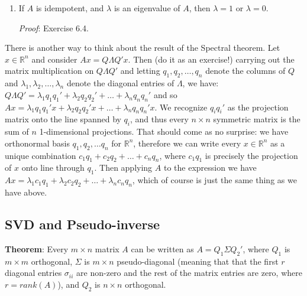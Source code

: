 \documentclass[12pt,oneside]{article}
\begin{document}
\begin{enumerate}
\item If $A$ is idempotent, and $\lambda$ is an
  eigenvalue of $A$, then $\lambda = 1$ or $\lambda = 0$.

 \emph{Proof}: Exercise 6.4.

\end{enumerate}

There is another way to think about the result of the Spectral
  theorem. Let $x \in \mathbb{R}^n$ and consider $Ax = Q \Lambda Q'
  x$. Then (do it as an exercise!) carrying out the matrix
  multiplication on $Q \Lambda Q'$ and letting $q_1, q_2, \ldots, q_n$
  denote the columns of $Q$ and $\lambda_1, \lambda_2, \ldots,
  \lambda_n$ denote the diagonal entries of $\Lambda$, we have: $Q
  \Lambda Q'= \lambda_1 q_1 q_1' + \lambda_2 q_2 q_2' + \ldots +
  \lambda_n q_n q_n'$ and so $Ax = \lambda_1 q_1 q_1' x + \lambda_2
  q_2 q_2' x + \ldots + \lambda_n q_n q_n' x$. We recognize $q_i q_i'$
  as the projection matrix onto the line spanned by $q_i$, and thus
  every $n \times n$ symmetric matrix is the sum of $n$ 1-dimensional
  projections. That should come as no surprise: we have orthonormal
  basis $q_1, q_2, \ldots q_n$ for $\mathbb{R}^n$, therefore we can
  write every $x \in \mathbb{R}^n$ as a unique combination $c_1 q_1 +
  c_2 q_2 + \ldots + c_n q_n$, where $c_1 q_1$ is precisely the
  projection of $x$ onto line through $q_1$. Then applying $A$ to the
  expression we have $Ax = \lambda_1 c_1 q_1 + \lambda_2 c_2 q_2 +
  \ldots + \lambda_n c_n q_n$, which of course is just the same thing
  as we have above.


\subsection{SVD and Pseudo-inverse}
\textbf{Theorem}: Every $m \times n$  matrix $A$ can be written as $A
= Q_1 \Sigma Q_2'$, where $Q_1$ is $m \times m$ orthogonal, $\Sigma$ is
$m \times n$ pseudo-diagonal (meaning that that the first $r$
diagonal entries $\sigma_{ii}$ are non-zero and the rest of the matrix
entries are zero, where $r = rank(A)$), and $Q_2$ is $n \times n$
orthogonal. 
\end{document}
